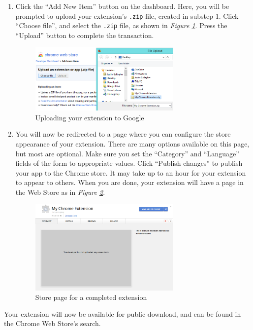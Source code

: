 \documentclass[11pt]{article}
\begin{document}
\begin{enumerate}
	\item Click the ``Add New Item'' button on the dashboard. Here, you will be prompted to upload your extension's \texttt{.zip} file, created in substep 1. Click ``Choose file'', and select the \texttt{.zip} file, as shown in \emph{Figure \ref{fig:uploadext}}. Press the ``Upload'' button to complete the transaction.\\

	\begin{figure}[htb]
	\centering
	\includegraphics[width=0.7\textwidth]{figures/uploadext.png}
	\caption{Uploading your extension to Google\label{fig:uploadext}}
	\end{figure}

	\item You will now be redirected to a page where you can configure the store appearance of your extension. There are many options available on this page, but most are optional. Make sure you set the ``Category'' and ``Language'' fields of the form to appropriate values. Click ``Publish changes'' to publish your app to the Chrome store. It may take up to an hour for your extension to appear to others. When you are done, your extension will have a page in the Web Store as in \emph{Figure \ref{fig:publishedext}}.\\

	\begin{figure}[htb]
	\centering
	\includegraphics[width=0.7\textwidth]{figures/publishedext.png}
	\caption{Store page for a completed extension\label{fig:publishedext}}
	\end{figure}
\end{enumerate}

Your extension will now be available for public download, and can be found in the Chrome Web Store's search.
\end{document}
